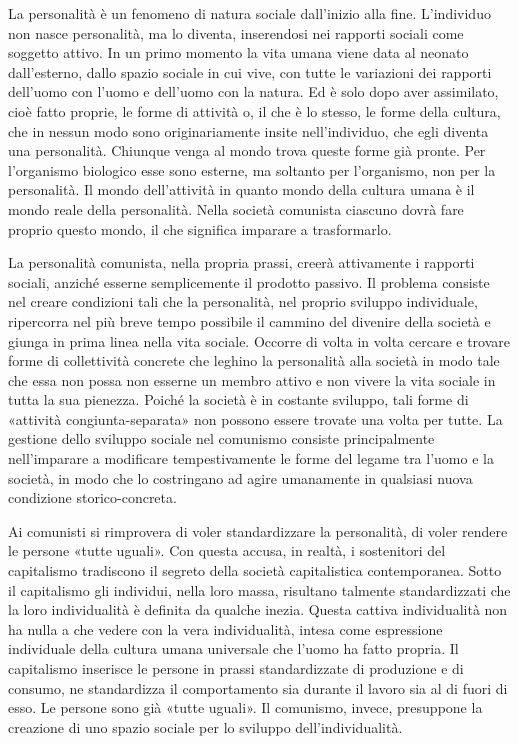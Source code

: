 \documentclass[12pt,a4paper,openany]{book}
\begin{document}
La personalità è un fenomeno di natura sociale dall'inizio alla fine. L'individuo non nasce personalità, ma lo diventa, inserendosi nei rapporti sociali come soggetto attivo. In un primo momento la vita umana viene data al neonato dall'esterno, dallo spazio sociale in cui vive, con tutte le variazioni dei rapporti dell'uomo con l'uomo e dell'uomo con la natura. Ed è solo dopo aver assimilato, cioè fatto proprie, le forme di attività o, il che è lo stesso, le forme della cultura, che in nessun modo sono originariamente insite nell'individuo, che egli diventa una personalità. Chiunque venga al mondo trova queste forme già pronte. Per l'organismo biologico esse sono esterne, ma soltanto per l'organismo, non per la personalità. Il mondo dell'attività in quanto mondo della cultura umana è il mondo reale della personalità. Nella società comunista ciascuno dovrà fare proprio questo mondo, il che significa imparare a trasformarlo.

La personalità comunista, nella propria prassi, creerà attivamente i rapporti sociali, anziché esserne semplicemente il prodotto passivo. Il problema consiste nel creare condizioni tali che la personalità, nel proprio sviluppo individuale, ripercorra nel più breve tempo possibile il cammino del divenire della società e giunga in prima linea nella vita sociale. Occorre di volta in volta cercare e trovare forme di collettività concrete che leghino la personalità alla società in modo tale che essa non possa non esserne un membro attivo e non vivere la vita sociale in tutta la sua pienezza. Poiché la società è in costante sviluppo, tali forme di «attività congiunta-separata» non possono essere trovate una volta per tutte. La gestione dello sviluppo sociale nel comunismo consiste principalmente nell'imparare a modificare tempestivamente le forme del legame tra l'uomo e la società, in modo che lo costringano ad agire umanamente in qualsiasi nuova condizione storico-concreta.

Ai comunisti si rimprovera di voler standardizzare la personalità, di voler rendere le persone «tutte uguali». Con questa accusa, in realtà, i sostenitori del capitalismo tradiscono il segreto della società capitalistica contemporanea. Sotto il capitalismo gli individui, nella loro massa, risultano talmente standardizzati che la loro individualità è definita da qualche inezia. Questa cattiva individualità non ha nulla a che vedere con la vera individualità, intesa come espressione individuale della cultura umana universale che l'uomo ha fatto propria. Il capitalismo inserisce le persone in prassi standardizzate di produzione e di consumo, ne standardizza il comportamento sia durante il lavoro sia al di fuori di esso. Le persone sono già «tutte uguali». Il comunismo, invece, presuppone la creazione di uno spazio sociale per lo sviluppo dell'individualità.
\end{document}
